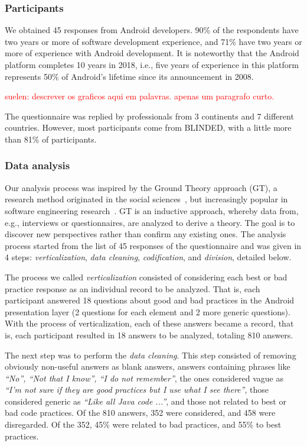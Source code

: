 \subsubsection{Participants}
\label{etapa-1-participantes}

We obtained 45 responses from Android developers. 
90\% of the respondents have two years or more of software development experience, 
and 71\% have two years or more of experience with Android development. 
It is noteworthy that the Android platform completes 10 years in 2018, i.e., 
five years of experience in this platform represents 50\% of Android's lifetime
since its announcement in 2008.

\textcolor{red}{suelen: descrever os graficos aqui em palavras. apenas um paragrafo curto.}

The questionnaire was replied by professionals from 3 continents and 7 different countries.
However, most participants come from BLINDED, with a little more than 81\% of participants.

\subsubsection{Data analysis}
\label{etapa-1-analise}

Our analysis process was inspired by the Ground Theory approach (GT), a research method originated in the social sciences~\cite{Strauss2007, GlaserStrauss1999}, but increasingly popular in software engineering research~\cite{Adolph2011}. 
GT is an inductive approach, whereby data from, e.g., interviews or questionnaires, are analyzed to derive a theory. The goal is to discover new perspectives rather than confirm any existing ones. The analysis process started from the list of 45 responses of the questionnaire and was given in 4 steps: \textit{verticalization}, \textit {data cleaning}, \textit {codification}, and \textit {division}, detailed below.

The process we called \textit{verticalization} consisted of considering each best or bad practice response as an individual record to be analyzed. That is, each participant answered 18 questions about good and bad practices in the Android presentation layer (2 questions for each element and 2 more generic questions). With the process of verticalization, each of these answers became a record, that is, each participant resulted in 18 answers to be analyzed, totaling 810 answers.

The next step was to perform the \textit{data cleaning}. This step consisted of removing obviously non-useful answers as blank answers, answers containing phrases like \textit{``No'', ``Not that I know'', ``I do not remember''}, the ones considered vague as \textit{``I'm not sure if they are good practices but I use what I see there''}, those considered generic as \textit{``Like all Java code ...''}, and those not related to best or bad code practices. Of the 810 answers, 352 were considered, and 458 were disregarded. Of the 352, 45\% were related to bad practices, and 55\% to best practices.

